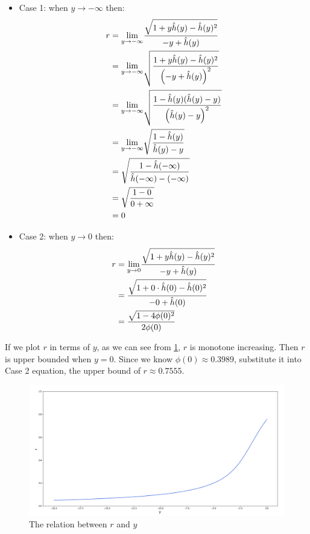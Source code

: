 \begin{itemize}
	\item Case 1: when $y \to -\infty$ then: \\ 
	\begin{equation}\notag
		\begin{split}
			r &=  \displaystyle{\lim_{y \to -\infty}}\frac{ \sqrt{1+y\hat{h}(y) -\hat{h}(y)^2}}{ -y + \hat{h}(y)} \\&= \displaystyle{\lim_{y \to -\infty}}\sqrt{\frac{ 1+y\hat{h}(y) -\hat{h}(y)^2}{\left(-y + \hat{h}(y)\right)^2}} \\&=  \displaystyle{\lim_{y \to -\infty}}\sqrt{\frac{ 1-\hat{h}(y)(\hat{h}(y)-y)}{\left(\hat{h}(y)-y \right)^2}}
			\\&= \displaystyle{\lim_{y \to -\infty}}\sqrt{\frac{ 1-\hat{h}(y)}{\hat{h}(y)-y }}\\&= \sqrt{\frac{ 1-\hat{h}(-\infty)}{\hat{h}(-\infty)-(-\infty) }}\\&= \sqrt{\frac{ 1-0}{0+ \infty}}\\&=0
		\end{split}
	\end{equation} 
	\item Case 2:  when $y \to 0$ then: \\ 
	\begin{equation}\notag
		\begin{split}
			r &=   \displaystyle{\lim_{y \to 0}}\frac{ \sqrt{1+y\hat{h}(y) -\hat{h}(y)^2}}{ -y + \hat{h}(y)} \\&= 
			\frac{ \sqrt{1+0\cdot \hat{h}(0) -\hat{h}(0)^2}}{ -0 + \hat{h}(0)} \\&= 
			\frac{ \sqrt{1-4\phi(0)^2}}{2\phi(0)} 
		\end{split}
	\end{equation} 
\end{itemize}
If we plot $r$ in terms of $y$, as we can see from \cref{fig:tnorm_r}, $r$ is monotone increasing. Then $r$ is upper bounded when $y = 0$. Since we know $\phi(0) \approx 0.3989$, substitute it into Case 2 equation, the upper bound of $r \approx 0.7555$.
\begin{figure}[H]
	\centering
	\includegraphics[width=1\textwidth]{tnorm_r}
	\caption{The relation between $r$ and $y$}
	\label{fig:tnorm_r}
\end{figure}
